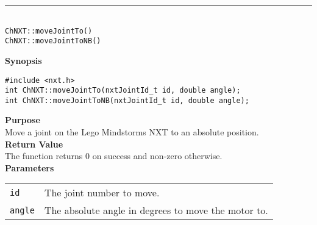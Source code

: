\noindent
\vspace{5pt}
\rule{4.5in}{0.015in}\\
\noindent
{\LARGE \texttt{ChNXT::moveJointTo()} }\\
{\LARGE \texttt{ChNXT::moveJointToNB()} }\\


\noindent
{\bf Synopsis}
\begin{lstlisting}
#include <nxt.h>
int ChNXT::moveJointTo(nxtJointId_t id, double angle);
int ChNXT::moveJointToNB(nxtJointId_t id, double angle);
\end{lstlisting}

\noindent
{\bf Purpose}\\
Move a joint on the Lego Mindstorms NXT to an absolute position.\\

\noindent
{\bf Return Value}\\
The function returns 0 on success and non-zero otherwise.\\

\noindent
{\bf Parameters}\\
\vspace{-0.1in}
\begin{description}
\item               
\begin{tabular}{p{10 mm}p{145 mm}}
\texttt{id} & The joint number to move. \\
\texttt{angle}&The absolute angle in degrees to move the motor to.\\
\end{tabular}
\end{description}

